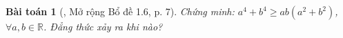 \documentclass{article}
\newtheorem{baitoan}{Bài toán}
\begin{document}
\begin{baitoan}[\cite{Son_Nghiep_Trung_Can2021}, Mở rộng Bổ đề 1.6, p. 7]
	Chứng minh: $a^4 + b^4\ge ab(a^2 + b^2)$, $\forall a,b\in\mathbb{R}$. Đẳng thức xảy ra khi nào?
\end{baitoan}






\printbibliography[heading=bibintoc]
	
\end{document}
